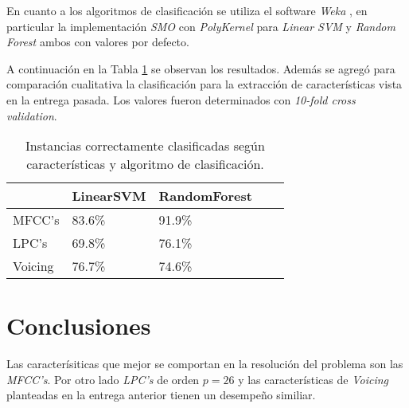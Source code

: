 \documentclass{article}
\begin{document}
En cuanto a los algoritmos de clasificación se utiliza el software \textit{Weka} \citep{hall2009weka}, en particular la implementación \textit{SMO} con \textit{PolyKernel} para \textit{Linear SVM} y \textit{Random Forest} ambos con valores por defecto.
\medskip

A continuación en la Tabla \ref{tab:resultados} se observan los resultados. Además se agregó para comparación cualitativa la clasificación para la extracción de características vista en la entrega pasada. Los valores fueron determinados con \textit{10-fold cross validation}.

\begin{table}[H]
\centering
\begin{tabular}{lllll}
\hline
 & LinearSVM & RandomForest \\ 
\hline
MFCC's & 83.6\% & 91.9\% \\
LPC's & 69.8\% & 76.1\% \\
Voicing & 76.7\% & 74.6\% \\
\hline                   
\end{tabular}
\caption{Instancias correctamente clasificadas según características y algoritmo de clasificación.}
\label{tab:resultados}
\end{table}


\section*{Conclusiones}

Las caracterísiticas que mejor se comportan en la resolución del problema son las \textit{MFCC's}. Por otro lado \textit{LPC's} de orden $p=26$ y las características de \textit{Voicing} planteadas en la entrega anterior tienen un desempeño similiar.



\newpage




\end{document}
